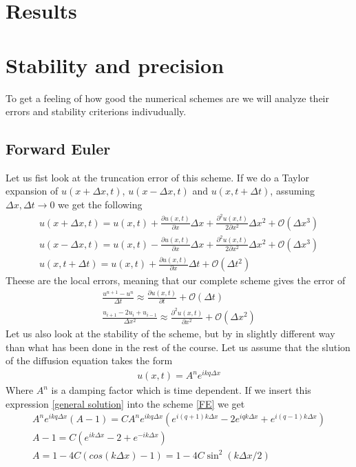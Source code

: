 \documentclass[a4paper,english, 10pt, twoside]{article}
\begin{document}
\section{Results}


\section{Stability and precision}
To get a feeling of how good the numerical schemes are we will analyze their errors and stability criterions indivudually.
\subsection{Forward Euler}
Let us fist look at the truncation error of this scheme. If we do a Taylor expansion of $u(x+\Delta x,t)$, $u(x-\Delta x,t)$ 
and $u(x,t+\Delta t)$, assuming $\Delta x,\Delta t \to 0$ we get the following
\begin{align*}
 u(x+\Delta x,t) = u(x,t) + \frac{\partial u(x,t)}{\partial x}\Delta x +\frac{\partial^2u(x,t)}{2\partial x^2}\Delta x^2 
 +\mathcal{O}(\Delta x^3)\\
 u(x-\Delta x,t) = u(x,t) - \frac{\partial u(x,t)}{\partial x}\Delta x +\frac{\partial^2u(x,t)}{2\partial x^2}\Delta x^2 
 +\mathcal{O}(\Delta x^3) \\
  u(x,t+\Delta t) = u(x,t) + \frac{\partial u(x,t)}{\partial x}\Delta t +\mathcal{O}(\Delta t^2)
 \end{align*}
Theese are the local errors, meaning that our complete scheme gives the error of 
\begin{align*}
 \frac{u^{n+1}-u^n}{\Delta t} \approx \frac{\partial u(x,t)}{\partial t} +\mathcal{O}(\Delta t)\\
 \frac{u_{i+1}-2u_i +u_{i-1}}{\Delta x^2} \approx \frac{\partial^2 u(x,t)}{\partial x^2} +\mathcal{O}(\Delta x^2)
\end{align*}
Let us also look at the stability of the scheme, but by in slightly different way than what has been done in the rest of the 
course. Let us assume that the slution of the diffusion equation takes the form
\begin{align}\label{general solution}
 u(x,t) = A^ne^{ikq\Delta x}
\end{align}
Where $A^n$ is a damping factor which is time dependent. If we insert this expression \ref{general solution} into the scheme 
\ref{FE} we get
\begin{align*}
 A^ne^{ikq\Delta x}(A-1) = CA^ne^{ikq\Delta x}(e^{i(q+1)k\Delta x}-2e^{iqk\Delta x} +e^{i(q-1)k \Delta x})\\
 A-1 = C(e^{ik\Delta x}-2+e^{-ik \Delta x})\\
 A = 1 - 4C(cos(k\Delta x)-1) = 1 -4C\sin^2(k\Delta x/2)
\end{align*}
\end{document}
